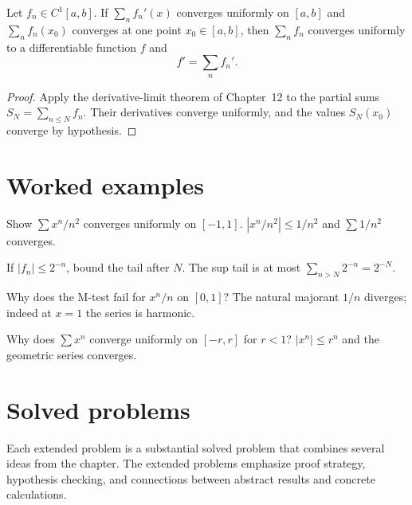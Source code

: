 \begin{theorem}\label{thm:ii13-04}
Let $f_n\in C^1[a,b]$. If $\sum_n f_n'(x)$ converges uniformly on $[a,b]$ and $\sum_n f_n(x_0)$ converges at one point $x_0\in[a,b]$, then $\sum_n f_n$ converges uniformly to a differentiable function $f$ and
\[
f'=\sum_n f_n'.
\]
\begin{proof}
Apply the derivative-limit theorem of Chapter~12 to the partial sums $S_N=\sum_{n\le N}f_n$. Their derivatives converge uniformly, and the values $S_N(x_0)$ converge by hypothesis.
\end{proof}
\end{theorem}

\section{Worked examples}

\begin{example}\label{ex:ii13-worked-01}
Show $\sum x^n/n^2$ converges uniformly on $[-1,1]$. $|x^n/n^2|\le1/n^2$ and $\sum1/n^2$ converges.
\end{example}

\begin{example}\label{ex:ii13-worked-02}
If $|f_n|\le2^{-n}$, bound the tail after $N$. The sup tail is at most $\sum_{n>N}2^{-n}=2^{-N}$.
\end{example}

\begin{example}\label{ex:ii13-worked-03}
Why does the M-test fail for $x^n/n$ on $[0,1]$? The natural majorant $1/n$ diverges; indeed at $x=1$ the series is harmonic.
\end{example}

\begin{example}\label{ex:ii13-worked-04}
Why does $\sum x^n$ converge uniformly on $[-r,r]$ for $r<1$? $|x^n|\le r^n$ and the geometric series converges.
\end{example}

\section{Solved problems}
Each extended problem is a substantial solved problem that combines several ideas from the chapter. The extended problems emphasize proof strategy, hypothesis checking, and connections between abstract results and concrete calculations.

